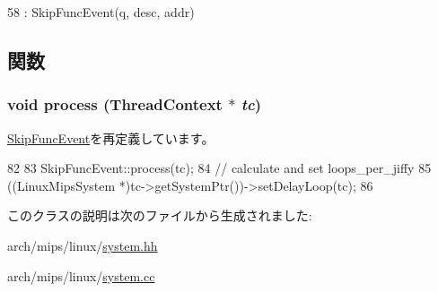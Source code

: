 \begin{DoxyCode}
58             : SkipFuncEvent(q, desc, addr) {}
\end{DoxyCode}


\subsection{関数}
\hypertarget{classLinuxMipsSystem_1_1SkipDelayLoopEvent_ad66a9d5ec7cfe597b848a17c0df5cc28}{
\subsubsection[{process}]{\setlength{\rightskip}{0pt plus 5cm}void process ({\bf ThreadContext} $\ast$ {\em tc})}}
\label{classLinuxMipsSystem_1_1SkipDelayLoopEvent_ad66a9d5ec7cfe597b848a17c0df5cc28}


\hyperlink{classSkipFuncEvent_ad66a9d5ec7cfe597b848a17c0df5cc28}{SkipFuncEvent}を再定義しています。


\begin{DoxyCode}
82 {
83     SkipFuncEvent::process(tc);
84     // calculate and set loops_per_jiffy
85     ((LinuxMipsSystem *)tc->getSystemPtr())->setDelayLoop(tc);
86 }
\end{DoxyCode}


このクラスの説明は次のファイルから生成されました:\begin{DoxyCompactItemize}
\item 
arch/mips/linux/\hyperlink{arch_2mips_2linux_2system_8hh}{system.hh}\item 
arch/mips/linux/\hyperlink{arch_2mips_2linux_2system_8cc}{system.cc}\end{DoxyCompactItemize}
